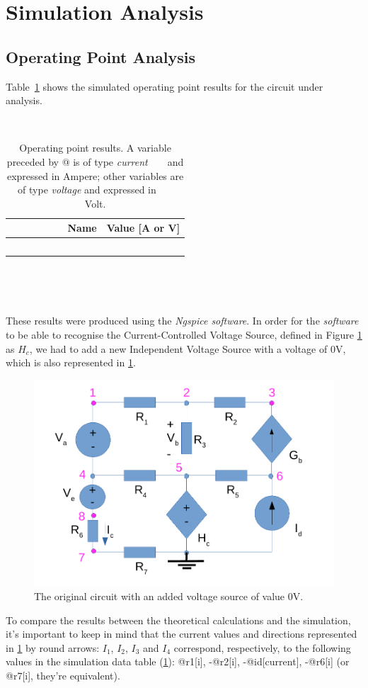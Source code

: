 \section{Simulation Analysis}
\label{sec:simulation}

\subsection{Operating Point Analysis}

Table~\ref{tab:op} shows the simulated operating point results for the circuit under analysis.

\begin{table}[htb!]
  \centering
  \begin{tabular}{|l|r|}
    \hline    
    {\bf Name} & {\bf Value [A or V]} \\ \hline
    
  \end{tabular}
  \caption{Operating point results. A variable preceded by @ is of type {\em current}
    and expressed in Ampere; other variables are of type {\it voltage} and expressed in
    Volt.}
  \label{tab:op}
\end{table}

These results were produced using the \textit{Ngspice software}. In order for the \textit{software} to be able to recognise the Current-Controlled Voltage Source, defined in Figure \ref{fig2} as $H_c$, we had to add a new Independent Voltage Source with a voltage of 0V, which is also represented in \ref{fig2}.


\begin{figure}[h] \centering
\includegraphics[width=0.4\linewidth]{t1-2.pdf}
\caption{The original circuit with an added voltage source of value 0V.}
\label{fig2}
\end{figure}


To compare the results between the theoretical calculations and the simulation, it's important to keep in mind that the current values and directions represented in \ref{fig2} by round arrows: $I_1$, $I_2$, $I_3$ and $I_4$ correspond, respectively, to the following values in the simulation data table (\ref{tab:op}): @r1[i], -@r2[i], -@id[current], -@r6[i] (or @r7[i], they're equivalent).


